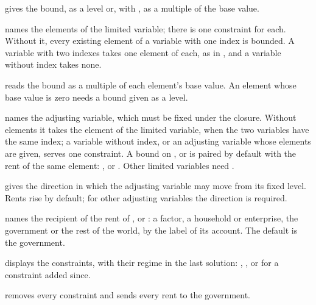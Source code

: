 \begin{optdesc}
\item[\optarg{up}{per}{\#} \textrm{or} \optarg{lo}{wer}{\#}] gives the bound,
as a level or, with , as a multiple of the base value.

\item[\optarg{el}{ements}{list}] names the elements of the limited variable;
there is one constraint for each. Without it, every existing element of a
variable with one index is bounded. A variable with two indexes takes one
element of each, as in , and a variable without
index takes none.

\item[\opt{sc}{ale}] reads the bound as a multiple of each element's base
value. An element whose base value is zero needs a bound given as a level.

\item[\optarg{adj}{ust}{variable \textup{[}elements\textup{]}}] names the
adjusting variable, which must be fixed under the closure. Without elements it
takes the element of the limited variable, when the two variables have the
same index; a variable without index, or an adjusting variable whose elements
are given, serves one constraint. A bound on ,  or  is
paired by default with the rent of the same element: ,  or
. Other limited variables need .

\item[\opt{}{up} \textrm{or} \opt{}{down}] gives the direction in which the
adjusting variable may move from its fixed level. Rents rise by default; for
other adjusting variables the direction is required.

\item[\optarg{rent}{s}{account}] names the recipient of the rent of
,  or : a factor, a household or enterprise, the
government or the rest of the world, by the label of its account. The default
is the government.

\item[\opt{}{list}] displays the constraints, with their regime in the last
solution: , , or  for a
constraint added since.

\item[\opt{}{clear}] removes every constraint and sends every rent to the
government.
\end{optdesc}


